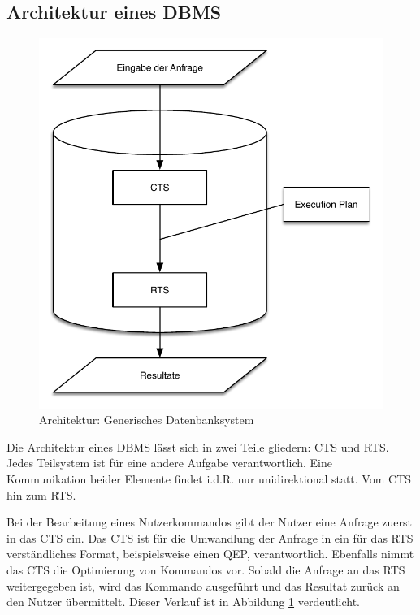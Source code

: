 \subsection{Architektur eines \ac{DBMS}}



\begin{figure}[ht]
  \centering
  \includegraphics[scale=0.75]{02_Related_Work/CTS_RTS.pdf}
  \caption{Architektur: Generisches Datenbanksystem}
  \label{Database_Architecture}
\end{figure}

Die Architektur eines \ac{DBMS} lässt sich in zwei Teile gliedern: \ac{CTS} und \ac{RTS}. Jedes Teilsystem ist für eine andere Aufgabe verantwortlich. Eine Kommunikation beider Elemente findet i.d.R. nur unidirektional statt. Vom \ac{CTS} hin zum \ac{RTS}.

Bei der Bearbeitung eines Nutzerkommandos gibt der Nutzer eine Anfrage zuerst in das \ac{CTS} ein. Das \ac{CTS} ist für die Umwandlung der Anfrage in ein für das \ac{RTS} verständliches Format, beispielsweise einen \ac{QEP}, verantwortlich. Ebenfalls nimmt das \ac{CTS} die Optimierung von Kommandos vor. Sobald die Anfrage an das \ac{RTS} weitergegeben ist, wird das Kommando ausgeführt und das Resultat zurück an den Nutzer übermittelt. Dieser Verlauf ist in Abbildung \ref{Database_Architecture} verdeutlicht.

